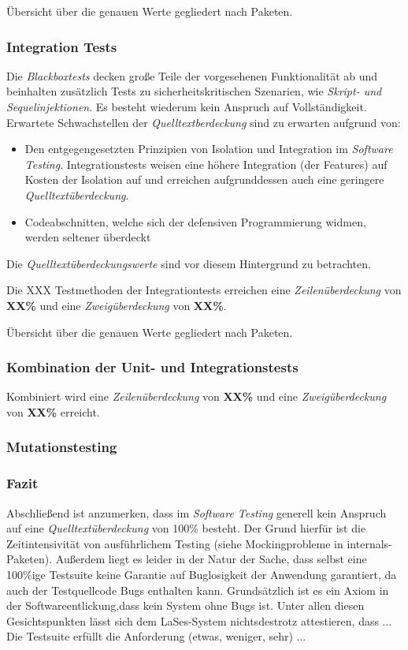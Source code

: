Übersicht über die genauen Werte gegliedert nach Paketen.


\subsubsection{Integration Tests}
Die \emph{Blackboxtests} decken große Teile der vorgesehenen Funktionalität ab und beinhalten zusätzlich Tests
zu sicherheitskritischen Szenarien, wie \emph{Skript- und Sequelinjektionen}.
Es besteht wiederum kein Anspruch auf Vollständigkeit.
Erwartete Schwachstellen der \emph{Quelltextberdeckung} sind zu erwarten aufgrund von:
\begin{itemize}
    \item Den entgegengesetzten Prinzipien von Isolation und Integration im \emph{Software Testing}.
    Integrationstests weisen eine höhere Integration (der Features) auf Kosten der Isolation auf und
    erreichen aufgrunddessen auch eine geringere \emph{Quelltextüberdeckung}.
    \item Codeabschnitten, welche sich der defensiven Programmierung widmen, werden seltener überdeckt
\end{itemize}
Die \emph{Quelltextüberdeckungswerte} sind vor diesem Hintergrund zu betrachten.

\newline

Die XXX Testmethoden der Integrationtests erreichen eine \emph{Zeilenüberdeckung} von \textbf{XX\%}
und eine \emph{Zweigüberdeckung} von \textbf{XX\%}.

Übersicht über die genauen Werte gegliedert nach Paketen.


\subsubsection{Kombination der Unit- und Integrationstests}

Kombiniert wird eine
\emph{Zeilenüberdeckung} von \textbf{XX\%} und eine \emph{Zweigüberdeckung} von \textbf{XX\%} erreicht.

\subsubsection{Mutationstesting}

\subsubsection{Fazit}
Abschließend ist anzumerken, dass im \emph{Software Testing} generell kein Anspruch auf eine \emph{Quelltextüberdeckung}
von 100\% besteht.
Der Grund hierfür ist die Zeitintensivität von ausführlichem Testing (siehe Mockingprobleme in internals-Paketen).
Außerdem liegt es leider in der Natur der Sache, dass selbst eine 100\%ige Testsuite keine Garantie auf Buglosigkeit
der Anwendung garantiert, da auch der Testquellcode Bugs enthalten kann.
Grundsätzlich ist es ein Axiom in der Softwareentlickung,dass kein System ohne Bugs ist.
Unter allen diesen Gesichtspunkten lässt sich dem LaSes-System nichtsdestrotz attestieren, dass ...
Die Testsuite erfüllt die Anforderung (etwas, weniger, sehr) ...